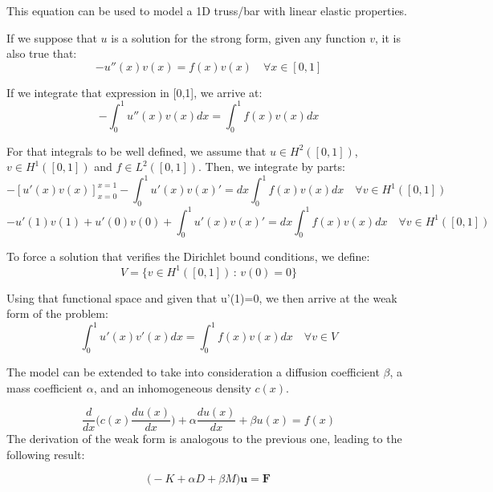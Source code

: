 \documentclass{article}
\begin{document}
\noindent This equation can be used to model a 1D truss/bar with linear elastic properties.


\noindent If we suppose that $u$ is a solution for the strong form, given any function $v$, it is also true that:
\begin{equation*}
    -u''(x)v(x) = f(x)v(x) \quad \forall x\in [0,1]
\end{equation*}

\noindent If we integrate that expression in [0,1], we arrive at:
\begin{equation*}
    -\int_0^1 u''(x)v(x)dx = \int_0^1 f(x)v(x) dx
\end{equation*}

\noindent For that integrals to be well defined, we assume that $u\in H^2([0,1])$, $v\in H^1([0,1])$ and $f\in L^2([0,1])$. Then, we integrate by parts:
\begin{equation*}
    -[u'(x)v(x)]_{x=0}^{x=1}-\int_0^1 u'(x)v(x)'=dx \int_0^1 f(x)v(x) dx \quad\forall v\in H^1([0,1])
\end{equation*}
\begin{equation*}
    -u'(1)v(1)+u'(0)v(0)+\int_0^1 u'(x)v(x)'=dx \int_0^1 f(x)v(x) dx \quad\forall v\in H^1([0,1])
\end{equation*}

\noindent To force a solution that verifies the Dirichlet bound conditions, we define:
\begin{equation*}
    V=\{ v\in H^1([0,1]) \, : \, v(0)=0\}
\end{equation*}

\noindent Using that functional space and given that u'(1)=0, we then arrive at the weak form of the problem:
\begin{equation}
    \int_0^1 u'(x)v'(x)dx= \int_0^1 f(x)v(x) dx \quad\forall v\in V
\end{equation}

The model can be extended to take into consideration a diffusion coefficient $\beta$, a mass coefficient $\alpha$, and an inhomogeneous density $c(x)$.

\begin{equation}
    \frac{d}{dx}\bigg( c(x) \frac{d u(x)}{dx} \bigg) + \alpha \frac{d u(x)}{dx} + \beta u(x) = f(x)
\end{equation}
The derivation of the weak form is analogous to the previous one, leading to the following result:

\begin{equation}
    \big(-K + \alpha D + \beta M\big) \mathbf{u} = \mathbf{F}
\end{equation}
\end{document}
